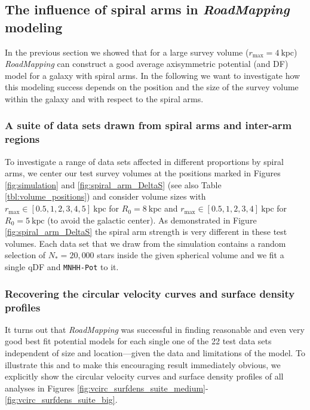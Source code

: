 \documentclass[iop,revtex4,numberedappendix,appendixfloats]{emulateapj}
\newcommand{\RM}{{\sl RoadMapping}}
\newcommand{\hiddenComment}[1]{}
\begin{document}
\hiddenComment{[TO DO: Jo writes: "If you make the equivalent of Figure 7 for fits that are especially good and those that are especially bad, is the difference between the qDF prediction and the data that went into the analysis very different? If so, that might be nice to point out and then say that we will investigate this in later work." $\longrightarrow$ I should do this as part of the review process.]}

\subsection{The influence of spiral arms in \RM{} modeling} \label{sec:results_part2}

In the previous section we showed that for a large survey volume ($r_\text{max}=4~\text{kpc}$) \RM{} can construct a good average axisymmetric potential (and DF) model for a galaxy with spiral arms. In the following we want to investigate how this modeling success depends on the position and the size of the survey volume within the galaxy and with respect to the spiral arms.

\subsubsection{A suite of data sets drawn from spiral arms and inter-arm regions} \label{sec:suite}

To investigate a range of data sets affected in different proportions by spiral arms, we center our test survey volumes at the positions marked in Figures \ref{fig:simulation} and \ref{fig:spiral_arm_DeltaS} (see also Table \ref{tbl:volume_positions}) and consider volume sizes with $r_\text{max} \in [0.5,1,2,3,4,5]~\text{kpc}$ for $R_0 = 8~\text{kpc}$ and $r_\text{max} \in [0.5,1,2,3,4]~\text{kpc}$ for $R_0 = 5~\text{kpc}$ (to avoid the galactic center). As demonstrated in Figure \ref{fig:spiral_arm_DeltaS} the spiral arm strength is very different in these test volumes. Each data set that we draw from the simulation contains a random selection of $N_*=20,000$ stars inside the given spherical volume and we fit a single qDF and \texttt{MNHH-Pot} to it. 

\subsubsection{Recovering the circular velocity curves and surface density profiles} \label{sec:circvel_surfdens}

It turns out that \RM{} was successful in finding reasonable and even very good best fit potential models for each single one of the 22 test data sets independent of size and location---given the data and limitations of the model. To illustrate this and to make this encouraging result immediately obvious, we explicitly show the circular velocity curves and surface density profiles of all analyses in Figures \ref{fig:vcirc_surfdens_suite_medium}-\ref{fig:vcirc_surfdens_suite_big}. 
\end{document}
